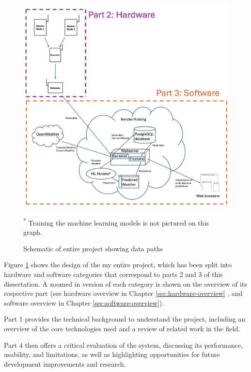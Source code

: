 \begin{figure}[H]
    \centering
    \includegraphics[width=1\textwidth]{contents/part-1/fig1/project-schema.png}
    \par\vspace{1pt} \noindent\begin{minipage}{0.95\textwidth}
        \centering\footnotesize\textsuperscript{*} Training the machine learning
        models is not pictured on this graph.
    \end{minipage}
    \par\vspace{1pt}
    \caption{Schematic of entire project showing data paths}
    \label{fig:project-schema}
\end{figure}

Figure \ref{fig:project-schema} shows the design of the my entire project, which
has been split into hardware and software categories that correspond to parts 2
and 3 of this dissertation.  A zoomed in version of each category is shown on
the overview of its respective part (see hardware overview in Chapter
\ref{sec:hardware-overview} , and software overview in Chapter
\ref{sec:software-overview}).

Part 1 provides the technical background to understand the project, including an
overview of the core technologies used and a review of related work in the
field.

Part 4 then offers a critical evaluation of the system, discussing its
performance, usability, and limitations, as well as highlighting opportunities
for future development improvements and research.